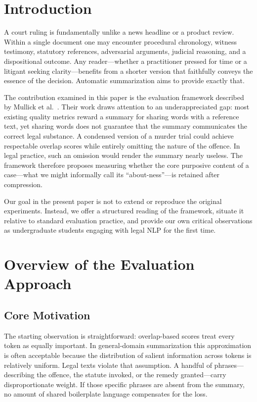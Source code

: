 \documentclass[conference]{IEEEtran}
\begin{document}
\section{Introduction}
A court ruling is fundamentally unlike a news headline or a product review. Within a single document one may encounter procedural chronology, witness testimony, statutory references, adversarial arguments, judicial reasoning, and a dispositional outcome. Any reader---whether a practitioner pressed for time or a litigant seeking clarity---benefits from a shorter version that faithfully conveys the essence of the decision. Automatic summarization aims to provide exactly that.

The contribution examined in this paper is the evaluation framework described by Mullick et al.\ \cite{mullick2022}. Their work draws attention to an underappreciated gap: most existing quality metrics reward a summary for sharing words with a reference text, yet sharing words does not guarantee that the summary communicates the correct legal substance. A condensed version of a murder trial could achieve respectable overlap scores while entirely omitting the nature of the offence. In legal practice, such an omission would render the summary nearly useless. The framework therefore proposes measuring whether the core purposive content of a case---what we might informally call its ``about-ness''---is retained after compression.

Our goal in the present paper is not to extend or reproduce the original experiments. Instead, we offer a structured reading of the framework, situate it relative to standard evaluation practice, and provide our own critical observations as undergraduate students engaging with legal NLP for the first time.

\section{Overview of the Evaluation Approach}

\subsection{Core Motivation}
The starting observation is straightforward: overlap-based scores treat every token as equally important. In general-domain summarization this approximation is often acceptable because the distribution of salient information across tokens is relatively uniform. Legal texts violate that assumption. A handful of phrases---describing the offence, the statute invoked, or the remedy granted---carry disproportionate weight. If those specific phrases are absent from the summary, no amount of shared boilerplate language compensates for the loss.
\end{document}
